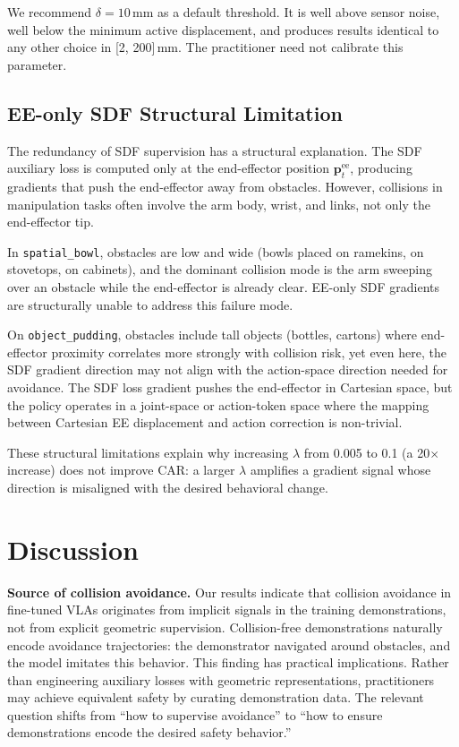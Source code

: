 \documentclass[10pt,letterpaper]{article}
\begin{document}
We recommend $\delta = 10$\,mm as a default threshold. It is well above sensor noise, well below the minimum active displacement, and produces results identical to any other choice in [2, 200]\,mm. The practitioner need not calibrate this parameter.

\subsection{EE-only SDF Structural Limitation}
\label{sec:ee_only}

The redundancy of SDF supervision has a structural explanation. The SDF auxiliary loss is computed only at the end-effector position $\mathbf{p}_t^{\text{ee}}$, producing gradients that push the end-effector away from obstacles. However, collisions in manipulation tasks often involve the arm body, wrist, and links, not only the end-effector tip.

In \texttt{spatial\_bowl}, obstacles are low and wide (bowls placed on ramekins, on stovetops, on cabinets), and the dominant collision mode is the arm sweeping over an obstacle while the end-effector is already clear. EE-only SDF gradients are structurally unable to address this failure mode.

On \texttt{object\_pudding}, obstacles include tall objects (bottles, cartons) where end-effector proximity correlates more strongly with collision risk, yet even here, the SDF gradient direction may not align with the action-space direction needed for avoidance. The SDF loss gradient pushes the end-effector in Cartesian space, but the policy operates in a joint-space or action-token space where the mapping between Cartesian EE displacement and action correction is non-trivial.

These structural limitations explain why increasing $\lambda$ from 0.005 to 0.1 (a 20$\times$ increase) does not improve CAR: a larger $\lambda$ amplifies a gradient signal whose direction is misaligned with the desired behavioral change.

\section{Discussion}
\label{sec:discussion}

\textbf{Source of collision avoidance.} Our results indicate that collision avoidance in fine-tuned VLAs originates from implicit signals in the training demonstrations, not from explicit geometric supervision. Collision-free demonstrations naturally encode avoidance trajectories: the demonstrator navigated around obstacles, and the model imitates this behavior. This finding has practical implications. Rather than engineering auxiliary losses with geometric representations, practitioners may achieve equivalent safety by curating demonstration data. The relevant question shifts from ``how to supervise avoidance'' to ``how to ensure demonstrations encode the desired safety behavior.''
\end{document}
